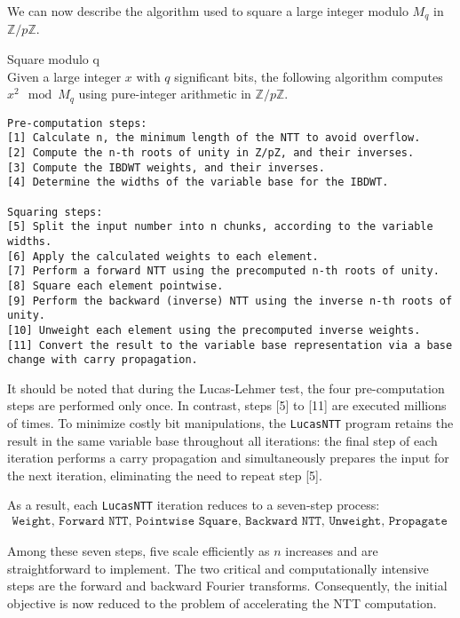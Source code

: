 \documentclass{article}
\begin{document}
We can now describe the algorithm used to square a large integer modulo $M_q$ in $\mathbb{Z}/p\mathbb{Z}$.

\begin{algorithm}{Square modulo q}\\
Given a large integer $x$ with $q$ significant bits, the following algorithm computes $x^2 \mod M_q$ using pure-integer arithmetic in $\mathbb{Z}/p\mathbb{Z}$.
\begin{verbatim}
Pre-computation steps:
[1] Calculate n, the minimum length of the NTT to avoid overflow.
[2] Compute the n-th roots of unity in Z/pZ, and their inverses.
[3] Compute the IBDWT weights, and their inverses.
[4] Determine the widths of the variable base for the IBDWT.

Squaring steps:
[5] Split the input number into n chunks, according to the variable widths.
[6] Apply the calculated weights to each element.
[7] Perform a forward NTT using the precomputed n-th roots of unity.
[8] Square each element pointwise.
[9] Perform the backward (inverse) NTT using the inverse n-th roots of unity.
[10] Unweight each element using the precomputed inverse weights.
[11] Convert the result to the variable base representation via a base change with carry propagation.
\end{verbatim}
\end{algorithm}

It should be noted that during the Lucas-Lehmer test, the four pre-computation steps are performed only once. In contrast, steps [5] to [11] are executed millions of times. To minimize costly bit manipulations, the \texttt{LucasNTT} program retains the result in the same variable base throughout all iterations: the final step of each iteration performs a carry propagation and simultaneously prepares the input for the next iteration, eliminating the need to repeat step [5].

As a result, each \texttt{LucasNTT} iteration reduces to a seven-step process:
\begin{align*}
\label{eq:ll_loop}
\texttt{Weight, Forward NTT, Pointwise Square, Backward NTT, Unweight, Propagate carry, Minus 2}
\end{align*}

Among these seven steps, five scale efficiently as $n$ increases and are straightforward to implement. The two critical and computationally intensive steps are the forward and backward Fourier transforms. Consequently, the initial objective is now reduced to the problem of accelerating the NTT computation.
\end{document}
